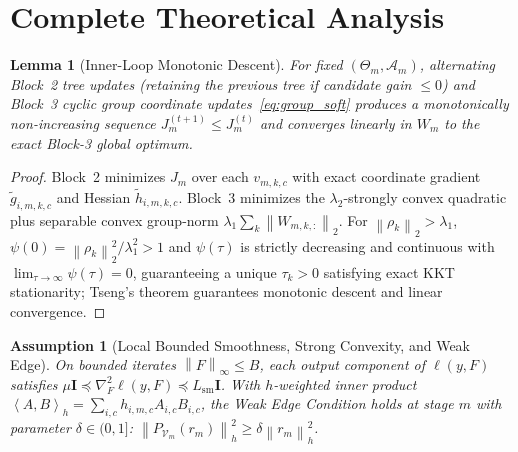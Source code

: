 \documentclass[11pt]{article}
\newtheorem{lemma}{Lemma}
\newtheorem{assumption}{Assumption}
\newcommand{\norm}[1]{\left\lVert #1 \right\rVert}
\newcommand{\inner}[2]{\left\langle #1, #2 \right\rangle}
\begin{document}
\section{Complete Theoretical Analysis}

\begin{lemma}[Inner-Loop Monotonic Descent]
\label{lem:inner_descent}
For fixed $(\Theta_m, \mathcal{A}_m)$, alternating Block~2 tree updates (retaining the previous tree if candidate gain $\le 0$) and Block~3 cyclic group coordinate updates~\eqref{eq:group_soft} produces a monotonically non-increasing sequence $J_m^{(t+1)} \le J_m^{(t)}$ and converges linearly in $W_m$ to the exact Block-3 global optimum.
\end{lemma}
\begin{proof}
Block~2 minimizes $J_m$ over each $v_{m,k,c}$ with exact coordinate gradient $\tilde{g}_{i,m,k,c}$ and Hessian $\tilde{h}_{i,m,k,c}$. Block~3 minimizes the $\lambda_2$-strongly convex quadratic plus separable convex group-norm $\lambda_1 \sum_k \norm{W_{m,k,:}}_2$. For $\norm{\rho_k}_2 > \lambda_1$, $\psi(0) = \norm{\rho_k}_2^2/\lambda_1^2 > 1$ and $\psi(\tau)$ is strictly decreasing and continuous with $\lim_{\tau\to\infty}\psi(\tau)=0$, guaranteeing a unique $\tau_k > 0$ satisfying exact KKT stationarity; Tseng's theorem guarantees monotonic descent and linear convergence.
\end{proof}

\begin{assumption}[Local Bounded Smoothness, Strong Convexity, and Weak Edge]
\label{assump:conv}
On bounded iterates $\norm{F}_\infty \le B$, each output component of $\ell(y, F)$ satisfies $\mu \mathbf{I} \preceq \nabla_F^2 \ell(y, F) \preceq L_{\mathrm{sm}} \mathbf{I}$. With $h$-weighted inner product $\inner{A}{B}_h = \sum_{i,c} h_{i,m,c} A_{i,c} B_{i,c}$, the Weak Edge Condition holds at stage $m$ with parameter $\delta \in (0, 1]$: $\norm{P_{\mathcal{V}_m}(r_m)}_h^2 \ge \delta \norm{r_m}_h^2$.
\end{assumption}
\end{document}
